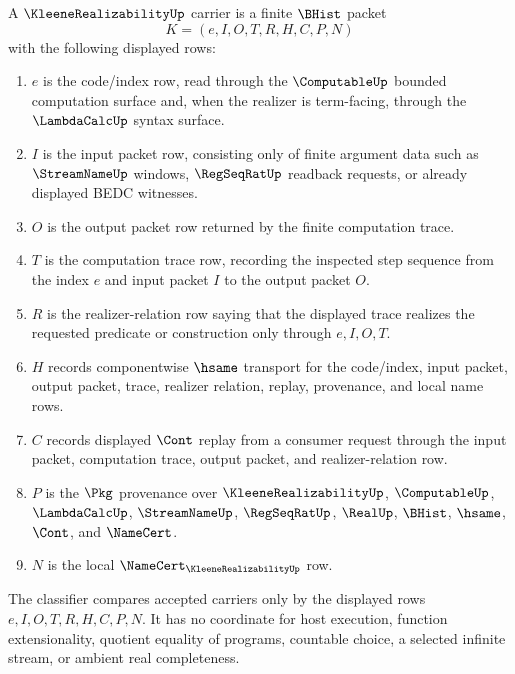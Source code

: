 \begin{definition}
\label{def:kleene-realizability-carrier}
A $\KleeneRealizabilityUp$ carrier is a finite $\BHist$ packet
$$
K=(e,I,O,T,R,H,C,P,N)
$$
with the following displayed rows:
\begin{enumerate}
\item $e$ is the code/index row, read through the $\ComputableUp$ bounded computation surface and, when the realizer is term-facing, through the $\LambdaCalcUp$ syntax surface.
\item $I$ is the input packet row, consisting only of finite argument data such as $\StreamNameUp$ windows, $\RegSeqRatUp$ readback requests, or already displayed BEDC witnesses.
\item $O$ is the output packet row returned by the finite computation trace.
\item $T$ is the computation trace row, recording the inspected step sequence from the index $e$ and input packet $I$ to the output packet $O$.
\item $R$ is the realizer-relation row saying that the displayed trace realizes the requested predicate or construction only through $e,I,O,T$.
\item $H$ records componentwise $\hsame$ transport for the code/index, input packet, output packet, trace, realizer relation, replay, provenance, and local name rows.
\item $C$ records displayed $\Cont$ replay from a consumer request through the input packet, computation trace, output packet, and realizer-relation row.
\item $P$ is the $\Pkg$ provenance over $\KleeneRealizabilityUp$, $\ComputableUp$, $\LambdaCalcUp$, $\StreamNameUp$, $\RegSeqRatUp$, $\RealUp$, $\BHist$, $\hsame$, $\Cont$, and $\NameCert$.
\item $N$ is the local $\NameCert_{\KleeneRealizabilityUp}$ row.
\end{enumerate}
The classifier compares accepted carriers only by the displayed rows $e,I,O,T,R,H,C,P,N$. It has no coordinate for host execution, function extensionality, quotient equality of programs, countable choice, a selected infinite stream, or ambient real completeness.
\end{definition}

